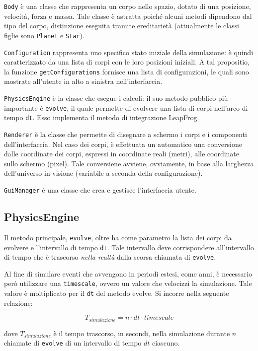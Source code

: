 \documentclass{article}
\begin{document}
\verb|Body| è una classe che rappresenta un corpo nello spazio, dotato di una posizione, velocità, forza e massa. Tale classe è astratta poiché alcuni metodi dipendono dal tipo del corpo, distinzione eseguita tramite ereditarietà (attualmente le classi figlie sono \verb|Planet| e \verb|Star|).

\verb|Configuration| rappresenta uno specifico stato iniziale della simulazione: è quindi caratterizzato da una lista di corpi con le loro posizioni iniziali. A tal propositio, la funzione \verb|getConfigurations| fornisce una lista di configurazioni, le quali sono mostrate all'utente in alto a sinistra nell'interfaccia.

\verb|PhysicsEngine| è la classe che esegue i calcoli: il suo metodo pubblico più importante è \verb|evolve|, il quale permette di evolvere una lista di corpi nell'arco di tempo \verb|dt|. Esso implementa il metodo di integrazione LeapFrog.

\verb|Renderer| è la classe che permette di disegnare a schermo i corpi e i componenti dell'interfaccia. Nel caso dei corpi, è effettuata un automatico una conversione dalle coordinate dei corpi, espressi in coordinate reali (metri), alle coordinate sullo schermo (pixel). Tale conversiene avviene, ovviamente, in base alla larghezza dell'universo in visione (variabile a seconda della configurazione).

\verb|GuiManager| è una classe che crea e gestisce l'interfaccia utente.

\subsection{PhysicsEngine}
\label{physics_engine}
Il metodo principale, \verb|evolve|, oltre ha come parametro la lista dei corpi da evolvere e l'intervallo di tempo \verb|dt|. Tale intervallo deve corrispondere all'intervallo di tempo che è trascorso \textit{nella realtà} dalla scorsa chiamata di \verb|evolve|.

Al fine di simulare eventi che avvengono in periodi estesi, come anni, è necessario però utilizzare una \verb|timescale|, ovvero un valore che velocizzi la simulazione. Tale valore è moltiplicato per il \verb|dt| del metodo evolve. Si incorre nella seguente relazione:

\begin{equation*}
    T_{simulazione} = n \cdot dt \cdot timescale
\end{equation*}

dove $T_{simulazione}$ è il tempo trascorso, in secondi, nella simulazione durante $n$ chiamate di \verb|evolve| di un intervallo di tempo $dt$ ciascuno.
\end{document}

